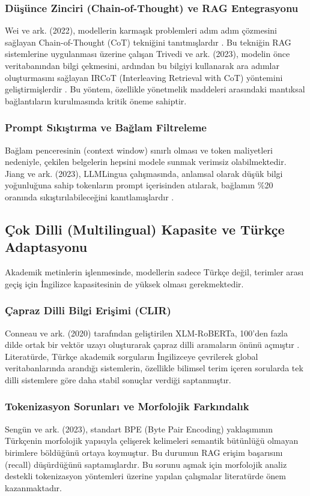 \documentclass[12pt,a4paper]{report}
\begin{document}
\subsubsection{Düşünce Zinciri (Chain-of-Thought) ve RAG Entegrasyonu}
Wei ve ark. (2022), modellerin karmaşık problemleri adım adım çözmesini sağlayan Chain-of-Thought (CoT) tekniğini tanıtmışlardır \cite{wei2022chain}. Bu tekniğin RAG sistemlerine uygulanması üzerine çalışan Trivedi ve ark. (2023), modelin önce veritabanından bilgi çekmesini, ardından bu bilgiyi kullanarak ara adımlar oluşturmasını sağlayan IRCoT (Interleaving Retrieval with CoT) yöntemini geliştirmişlerdir \cite{trivedi2023interleaving}. Bu yöntem, özellikle yönetmelik maddeleri arasındaki mantıksal bağlantıların kurulmasında kritik öneme sahiptir.

\subsubsection{Prompt Sıkıştırma ve Bağlam Filtreleme}
Bağlam penceresinin (context window) sınırlı olması ve token maliyetleri nedeniyle, çekilen belgelerin hepsini modele sunmak verimsiz olabilmektedir. Jiang ve ark. (2023), LLMLingua çalışmasında, anlamsal olarak düşük bilgi yoğunluğuna sahip tokenların prompt içerisinden atılarak, bağlamın \%20 oranında sıkıştırılabileceğini kanıtlamışlardır \cite{jiang2023llmlingua}. 

\subsection{Çok Dilli (Multilingual) Kapasite ve Türkçe Adaptasyonu}
Akademik metinlerin işlenmesinde, modellerin sadece Türkçe değil, terimler arası geçiş için İngilizce kapasitesinin de yüksek olması gerekmektedir.

\subsubsection{Çapraz Dilli Bilgi Erişimi (CLIR)}
Conneau ve ark. (2020) tarafından geliştirilen XLM-RoBERTa, 100'den fazla dilde ortak bir vektör uzayı oluşturarak çapraz dilli aramaların önünü açmıştır \cite{conneau2019unsupervised}. Literatürde, Türkçe akademik sorguların İngilizceye çevrilerek global veritabanlarında arandığı sistemlerin, özellikle bilimsel terim içeren sorularda tek dilli sistemlere göre daha stabil sonuçlar verdiği saptanmıştır.

\subsubsection{Tokenizasyon Sorunları ve Morfolojik Farkındalık}
Sengün ve ark. (2023), standart BPE (Byte Pair Encoding) yaklaşımının Türkçenin morfolojik yapısıyla çelişerek kelimeleri semantik bütünlüğü olmayan birimlere böldüğünü ortaya koymuştur. Bu durumun RAG erişim başarısını (recall) düşürdüğünü saptamışlardır. Bu sorunu aşmak için morfolojik analiz destekli tokenizasyon yöntemleri üzerine yapılan çalışmalar literatürde önem kazanmaktadır.
\end{document}
